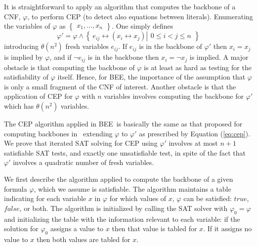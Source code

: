 \documentclass[runningheads,a4paper]{llncs}
\newcommand{\true}{\texttt{true}}
\newcommand{\set}[1]{\left\{
      \begin{array}{l}\!\!#1\!\!\end{array}
      \right\}}
\newcommand{\sset}[2]{\left\{~#1  \left|
      \begin{array}{l}#2\end{array}
    \right.     \right\}}
\newcommand{\false}{\mathit{false}}
\renewcommand{\true}{\mathit{true}}
\newcommand{\bee}{\textsf{BEE}}
\begin{document}
It is straightforward to apply an algorithm that computes the backbone
of a CNF, $\varphi$, to perform CEP (to detect also equations between
literals). Enumerating the variables of $\varphi$ as
$\set{x_1,\ldots,x_n}$. One simply defines
\begin{equation}
  \label{eq:cep}
  \varphi' =
         \varphi\land
         \sset{e_{ij}\leftrightarrow (x_i\leftrightarrow x_j)}
              {0\leq i<j\leq n}
\end{equation}
introducing $\theta(n^2)$ fresh variables $e_{ij}$. If $e_{ij}$ is in
the backbone of $\varphi'$ then $x_i=x_j$ is implied by $\varphi$, and if
$\neg e_{ij}$ is in the backbone then $x_i= \neg x_j$ is implied.
A major obstacle is that computing the backbone of $\varphi$ is at
least as hard as testing for the satisfiability of $\varphi$
itself. Hence, for \bee, the importance of the assumption that
$\varphi$ is only a small fragment of the CNF of interest. Another
obstacle is that the application of CEP for $\varphi$ with $n$
variables involves computing the backbone for $\varphi'$ which has
$\theta(n^2)$ variables.

The CEP algorithm applied in \bee\ is basically the same as that
proposed for computing backbones in~\cite{Marques-SilvaJL10} extending
$\varphi$ to $\varphi'$ as prescribed by Equation (\ref{eq:cep}). We
prove that iterated SAT solving for CEP using $\varphi'$ involves at
most $n+1$ satisfiable SAT tests, and exactly one unsatisfiable test,
in spite of the fact that $\varphi'$ involves a quadratic number of
fresh variables.

We first describe the algorithm applied to compute the backbone of a
given formula $\varphi$, which we assume is satisfiable.
The algorithm maintains a table indicating for each variable $x$ in
$\varphi$ for which values of $x$, $\varphi$ can be satisfied:
$\true$, $\false$, or both. The algorithm is initialized by calling
the SAT solver with $\varphi_0 = \varphi$ and initializing the table
with the information relevant to each variable: if the solution for
$\varphi_0$ assigns a value to $x$ then that value is tabled for
$x$. If it assigns no value to $x$ then both values are tabled for
$x$.
\end{document}
